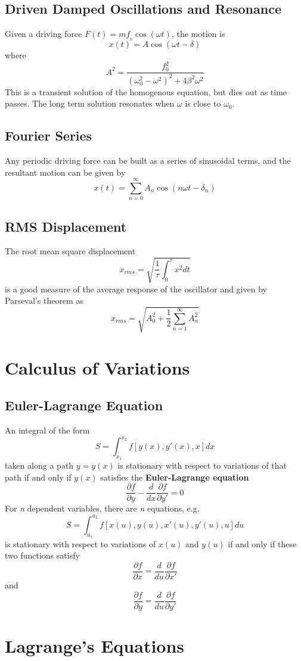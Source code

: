 \documentclass{article}
\begin{document}
\subsection*{Driven Damped Oscillations and Resonance}
Given a driving force $F(t) = mf__0\cos(\omega t)$, the motion is 
$$
x(t) = A\cos(\omega t - \delta)
$$
where 
$$
A^2 = \frac{f_0^2}{(\omega_0^2 - \omega^2)^2 + 4\beta^2\omega^2}
$$
This is a transient solution of the homogenous equation, but dies out as time passes.  The long term solution resonates when $\omega$ is close to $\omega_0$.
\subsection*{Fourier Series}
Any periodic driving force can be built as a series of sinusoidal terms, and the resultant motion can be given by 
$$
x(t) = \sum_{n=0}^\infty A_n\cos(n\omega t - \delta_n)
$$
\subsection*{RMS Displacement}
The root mean square displacement 
$$
x_{rms} = \sqrt{\frac{1}{\tau} \int_0^\tau x^2 dt}
$$
is a good measure of the average response of the oscillator and given by Parseval's theorem as
$$
x_{rms} = \sqrt{A_0^2 + \frac{1}{2}\sum_{n=1}^\infty A_n^2}
$$
 \section{Calculus of Variations}
\subsection*{Euler-Lagrange Equation}
An integral of the form
$$
S = \int_{x_{1}}^{x_2} f[y(x), y'(x), x]dx
$$
taken along a path $y=y(x)$ is stationary with respect to variations of that path if and only if $y(x)$ satisfies the \textbf{Euler-Lagrange equation}
$$
\frac{\partial f}{\partial y} - \frac{d}{dx}\frac{\partial f}{\partial y'} = 0
$$
For \textit{n} dependent variables, there are \textit{n} equations, e.g.
$$
S = \int_{u_{1}}^{u_2} f[x(u), y(u), x'(u), y'(u), u]du
$$
is stationary with respect to variations of $x(u)$ and $y(u)$ if and only if these two functions satisfy
$$
\frac{\partial f}{\partial x} = \frac{d}{du}\frac{\partial f}{\partial x'}
$$
and
$$
\frac{\partial f}{\partial y} = \frac{d}{du}\frac{\partial f}{\partial y'}
$$
\section{Lagrange's Equations}
\end{document}
